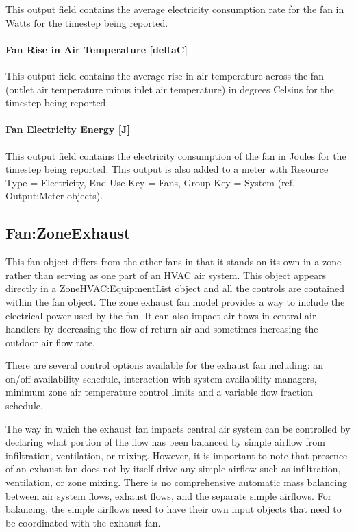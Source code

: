 This output field contains the average electricity consumption rate for the fan in Watts for the timestep being reported.

\paragraph{Fan Rise in Air Temperature {[}deltaC{]}}\label{fan-rise-in-air-temperature-deltac-2}

This output field contains the average rise in air temperature across the fan (outlet air temperature minus inlet air temperature) in degrees Celsius for the timestep being reported.

\paragraph{Fan Electricity Energy {[}J{]}}\label{fan-electric-energy-j-2}

This output field contains the electricity consumption of the fan in Joules for the timestep being reported. This output is also added to a meter with Resource Type = Electricity, End Use Key = Fans, Group Key = System (ref. Output:Meter objects).

\subsection{Fan:ZoneExhaust}\label{fanzoneexhaust}

This fan object differs from the other fans in that it stands on its own in a zone rather than serving as one part of an HVAC air system. This object appears directly in a \hyperref[zonehvacequipmentlist]{ZoneHVAC:EquipmentList} object and all the controls are contained within the fan object. The zone exhaust fan model provides a way to include the electrical power used by the fan. It can also impact air flows in central air handlers by decreasing the flow of return air and sometimes increasing the outdoor air flow rate.

There are several control options available for the exhaust fan including: an on/off availability schedule, interaction with system availability managers, minimum zone air temperature control limits and a variable flow fraction schedule.

The way in which the exhaust fan impacts central air system can be controlled by declaring what portion of the flow has been balanced by simple airflow from infiltration, ventilation, or mixing. However, it is important to note that presence of an exhaust fan does not by itself drive any simple airflow such as infiltration, ventilation, or zone mixing. There is no comprehensive automatic mass balancing between air system flows, exhaust flows, and the separate simple airflows. For balancing, the simple airflows need to have their own input objects that need to be coordinated with the exhaust fan.

